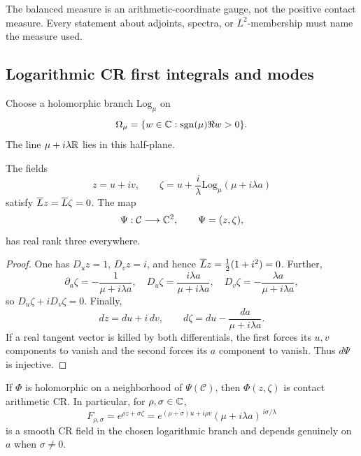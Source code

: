 \begin{warning}
The balanced measure is an arithmetic-coordinate gauge, not the positive contact
measure.  Every statement about adjoints, spectra, or $L^2$-membership must name
the measure used.
\end{warning}

\subsection{Logarithmic CR first integrals and modes}

Choose a holomorphic branch $\mathrm{Log}_{\mu}$ on
\[
 \Omega_\mu=\{w\in\mathbb{C}:\operatorname{sgn}(\mu)\Re w>0\}.
\]
The line $\mu+i\lambda\mathbb{R}$ lies in this half-plane.

\begin{proposition}
\label{prop:contact-logarithmic-first-integrals}
The fields
\begin{equation}\label{eq:contact-first-integrals}
 z=u+iv,\qquad
 \zeta=u+\frac{i}{\lambda}\mathrm{Log}_{\mu}(\mu+i\lambda a)
\end{equation}
satisfy $\overline L z=\overline L\zeta=0$.  The map
\begin{equation}\label{eq:contact-cr-embedding}
 \Psi:\mathcal C\longrightarrow\mathbb{C}^2,\qquad \Psi=(z,\zeta),
\end{equation}
has real rank three everywhere.
\end{proposition}

\begin{proof}
One has $D_uz=1$, $D_vz=i$, and hence
$\overline L z=\tfrac12(1+i^2)=0$.  Further,
\[
 \partial_a\zeta=-\frac1{\mu+i\lambda a},\quad
 D_u\zeta=\frac{i\lambda a}{\mu+i\lambda a},\quad
 D_v\zeta=-\frac{\lambda a}{\mu+i\lambda a},
\]
so $D_u\zeta+iD_v\zeta=0$.  Finally,
\[
 dz=du+i\,dv,\qquad d\zeta=du-\frac{da}{\mu+i\lambda a}.
\]
If a real tangent vector is killed by both differentials, the first forces its
$u,v$ components to vanish and the second forces its $a$ component to vanish.
Thus $d\Psi$ is injective.
\end{proof}

\begin{corollary}\label{cor:contact-cr-modes}
If $\Phi$ is holomorphic on a neighborhood of $\Psi(\mathcal C)$, then
$\Phi(z,\zeta)$ is contact arithmetic CR.  In particular, for
$\rho,\sigma\in\mathbb{C}$,
\begin{equation}\label{eq:contact-exponential-modes}
 F_{\rho,\sigma}
 =e^{\rho z+\sigma\zeta}
 =e^{(\rho+\sigma)u+i\rho v}
   (\mu+i\lambda a)^{\,i\sigma/\lambda}
\end{equation}
is a smooth CR field in the chosen logarithmic branch and depends genuinely on
$a$ when $\sigma\ne0$.
\end{corollary}

